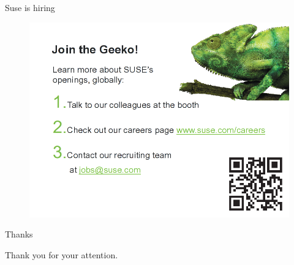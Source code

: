 \documentclass{beamer}
\begin{document}
\begin{frame}{Suse is hiring}
  \begin{figure}
    \includegraphics[width= 0.8\linewidth]{suse_hiring.png}
  \end{figure}
\end{frame}

\begin{frame}{Thanks}
  \begin{center}
    Thank you for your attention.
  \end{center}
\end{frame}
\end{document}
